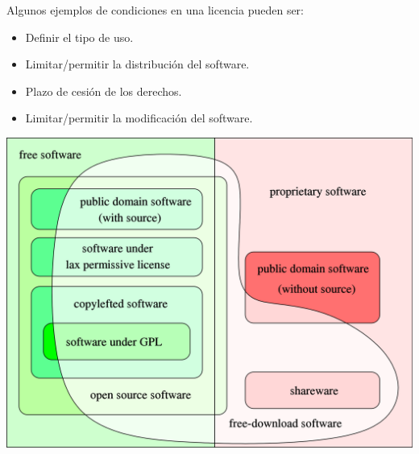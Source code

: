 {
    \begin{minipage}{0.4\linewidth}
        Algunos ejemplos de condiciones en una licencia pueden ser:
        \begin{itemize}
            \item Definir el tipo de uso.
            \item Limitar/permitir la distribución del software.
            \item Plazo de cesión de los derechos.
            \item Limitar/permitir la modificación del software.
        \end{itemize}
    \end{minipage}
    \hfill
    \begin{minipage}{0.55\linewidth}
            \includegraphics[width=\linewidth]{free_and_nonfree_software.png}
    \end{minipage}
}



